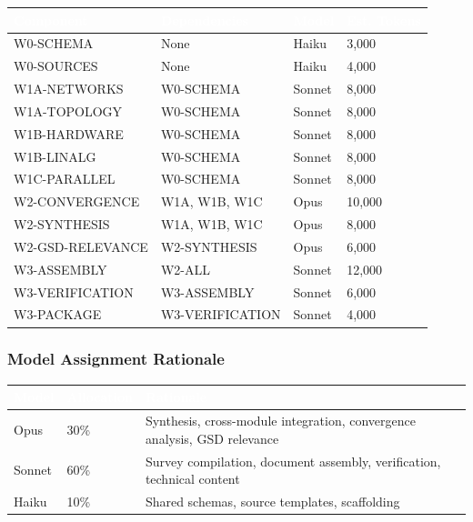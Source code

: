 \documentclass[11pt,letterpaper]{article}
\newcommand{\tableheader}[1]{\textbf{\sffamily\textcolor{white}{#1}}}
\begin{document}
\begin{center}
\begin{tabularx}{\textwidth}{L{3.5cm}L{2.5cm}C{1.5cm}C{2cm}}
\toprule
{}
\tableheader{Component} & \tableheader{Dependencies} & \tableheader{Model} & \tableheader{Est. Tokens} \\
\midrule
W0-SCHEMA & None & Haiku & 3,000 \\
W0-SOURCES & None & Haiku & 4,000 \\
W1A-NETWORKS & W0-SCHEMA & Sonnet & 8,000 \\
W1A-TOPOLOGY & W0-SCHEMA & Sonnet & 8,000 \\
W1B-HARDWARE & W0-SCHEMA & Sonnet & 8,000 \\
W1B-LINALG & W0-SCHEMA & Sonnet & 8,000 \\
W1C-PARALLEL & W0-SCHEMA & Sonnet & 8,000 \\
W2-CONVERGENCE & W1A, W1B, W1C & Opus & 10,000 \\
W2-SYNTHESIS & W1A, W1B, W1C & Opus & 8,000 \\
W2-GSD-RELEVANCE & W2-SYNTHESIS & Opus & 6,000 \\
W3-ASSEMBLY & W2-ALL & Sonnet & 12,000 \\
W3-VERIFICATION & W3-ASSEMBLY & Sonnet & 6,000 \\
W3-PACKAGE & W3-VERIFICATION & Sonnet & 4,000 \\
\bottomrule
\end{tabularx}
\end{center}

\subsubsection{Model Assignment Rationale}

\begin{center}
\begin{tabularx}{\textwidth}{C{1.5cm}C{1.5cm}X}
\toprule
{}
\tableheader{Model} & \tableheader{Allocation} & \tableheader{Rationale} \\
\midrule
Opus & 30\% & Synthesis, cross-module integration, convergence analysis, GSD relevance \\
Sonnet & 60\% & Survey compilation, document assembly, verification, technical content \\
Haiku & 10\% & Shared schemas, source templates, scaffolding \\
\bottomrule
\end{tabularx}
\end{center}
\end{document}
